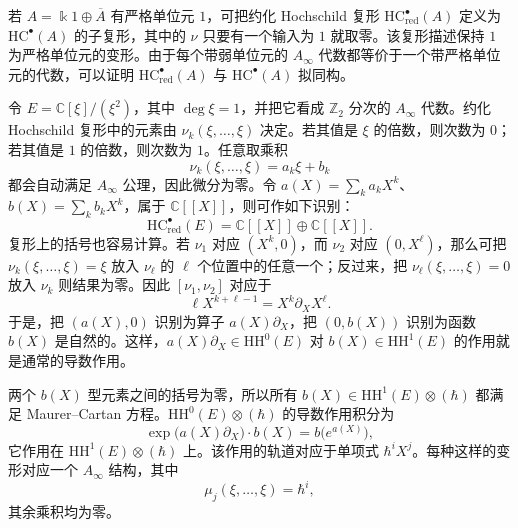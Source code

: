 \begin{note}[约化 Hochschild 复形]
若 $A=\Bbbk 1\oplus\overline A$ 有严格单位元 $1$，可把约化 Hochschild 复形 $\mathrm{HC}^{\bullet}_{\mathrm{red}}(A)$ 定义为 $\mathrm{HC}^{\bullet}(A)$ 的子复形，其中的 $\nu$ 只要有一个输入为 $1$ 就取零。该复形描述保持 $1$ 为严格单位元的变形。由于每个带弱单位元的 $A_\infty$ 代数都等价于一个带严格单位元的代数，可以证明 $\mathrm{HC}^{\bullet}_{\mathrm{red}}(A)$ 与 $\mathrm{HC}^{\bullet}(A)$ 拟同构。
\end{note}

\begin{example}[对偶数代数的变形]
令 $E=\mathbb C[\xi]/(\xi^2)$，其中 $\deg\xi=1$，并把它看成 $\mathbb Z_2$ 分次的 $A_\infty$ 代数。约化 Hochschild 复形中的元素由 $\nu_k(\xi,\ldots,\xi)$ 决定。若其值是 $\xi$ 的倍数，则次数为 $0$；若其值是 $1$ 的倍数，则次数为 $1$。任意取乘积
\[
  \nu_k(\xi,\ldots,\xi)=a_k\xi+b_k
\]
都会自动满足 $A_\infty$ 公理，因此微分为零。令 $a(X)=\sum_k a_kX^k$、$b(X)=\sum_k b_kX^k$，属于 $\mathbb C[[X]]$，则可作如下识别：
\[
  \mathrm{HC}^{\bullet}_{\mathrm{red}}(E)=\mathbb C[[X]]\oplus\mathbb C[[X]].
\]
复形上的括号也容易计算。若 $\nu_1$ 对应 $(X^k,0)$，而 $\nu_2$ 对应 $(0,X^\ell)$，那么可把 $\nu_k(\xi,\ldots,\xi)=\xi$ 放入 $\nu_\ell$ 的 $\ell$ 个位置中的任意一个；反过来，把 $\nu_\ell(\xi,\ldots,\xi)=0$ 放入 $\nu_k$ 则结果为零。因此 $[\nu_1,\nu_2]$ 对应于
\[
  \ell X^{k+\ell-1}=X^k\partial_X X^\ell.
\]
于是，把 $(a(X),0)$ 识别为算子 $a(X)\partial_X$，把 $(0,b(X))$ 识别为函数 $b(X)$ 是自然的。这样，$a(X)\partial_X\in\mathrm{HH}^0(E)$ 对 $b(X)\in\mathrm{HH}^1(E)$ 的作用就是通常的导数作用。

两个 $b(X)$ 型元素之间的括号为零，所以所有 $b(X)\in\mathrm{HH}^1(E)\otimes(\hbar)$ 都满足 Maurer--Cartan 方程。$\mathrm{HH}^0(E)\otimes(\hbar)$ 的导数作用积分为
\[
  \exp\bigl(a(X)\partial_X\bigr)\cdot b(X)=b\bigl(e^{a(X)}\bigr),
\]
它作用在 $\mathrm{HH}^1(E)\otimes(\hbar)$ 上。该作用的轨道对应于单项式 $\hbar^iX^j$。每种这样的变形对应一个 $A_\infty$ 结构，其中
\[
  \mu_j(\xi,\ldots,\xi)=\hbar^i,
\]
其余乘积均为零。
\end{example}

